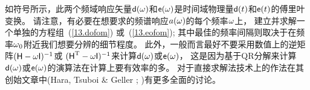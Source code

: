 {{{\en

如符号所示，此两个频域响应矢量$\ssd(\om)$和$\sse(\om)$是时间域物理量$\ssd(t)$和$\sse(t)$的傅里叶变换。
请注意，有必要在想要求的频谱响应$a(\om)$的每个频率$\om$上，
建立并求解一个单独的方程组~(\ref{13.dofom}) 或~(\ref{13.eofom});
其中最佳的频率间隔则取决于在频率$\om_0$附近我们想要分辨的细节程度。
此外，一般而言最好不要采用数值上的逆矩阵$(\ssH-\om\ssI)^{-1}$或
$(\ssH^{\rm T}-\om\ssI)^{-1}$来计算$\ssd(\om)$或$\sse(\om)$，
这是因为基于QR分解来计算$\ssd(\om)$或$\sse(\om)$的演算法在计算上要有效率的多。
对于直接求解法技术上的作法在其创始文章中(Hara,
Tsuboi \& Geller \citeyear{hara&al91}; \citeyear{hara&al93})有更多全面的讨论。

}}}

